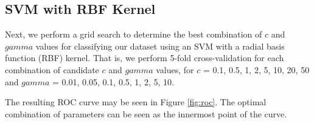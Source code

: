 \documentclass[]{article}
\begin{document}




\subsection{SVM with RBF Kernel}

Next, we perform a grid search to determine the best combination of $c$ and $gamma$ values for classifying our dataset using an SVM with a radial basis function (RBF) kernel.  That is, we perform 5-fold cross-validation for each combination of candidate $c$ and $gamma$ values, for $c$ = 0.1, 0.5, 1, 2, 5,
10, 20, 50 and $gamma$ = 0.01, 0.05, 0.1, 0.5, 1, 2,
5, 10.

The resulting ROC curve may be seen in Figure \ref{fig:roc}.  The optimal combination of parameters can be seen as the innermost point of the curve.

\end{document}
